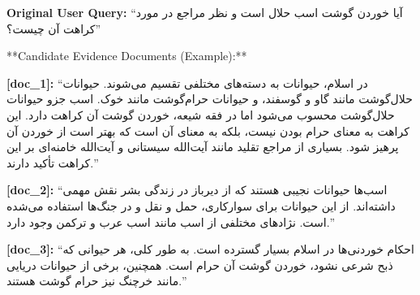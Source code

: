 \documentclass[11pt]{article}
\newcommand{\fa}[1]{\textfarsi{#1}}
\begin{document}
\noindent\textbf{Original User Query:} \fa{``آیا خوردن گوشت اسب حلال است و نظر مراجع در مورد کراهت آن چیست؟''}

\begin{PromptBlock}

**Candidate Evidence Documents (Example):**
\end{PromptBlock}

\noindent\textbf{[doc\_1]:} \fa{``در اسلام، حیوانات به دسته‌های مختلفی تقسیم می‌شوند. حیوانات حلال‌گوشت مانند گاو و گوسفند، و حیوانات حرام‌گوشت مانند خوک. اسب جزو حیوانات حلال‌گوشت محسوب می‌شود اما در فقه شیعه، خوردن گوشت آن کراهت دارد. این کراهت به معنای حرام بودن نیست، بلکه به معنای آن است که بهتر است از خوردن آن پرهیز شود. بسیاری از مراجع تقلید مانند آیت‌الله سیستانی و آیت‌الله خامنه‌ای بر این کراهت تأکید دارند.''}

\begin{PromptBlock}
\end{PromptBlock}

\noindent\textbf{[doc\_2]:} \fa{``اسب‌ها حیوانات نجیبی هستند که از دیرباز در زندگی بشر نقش مهمی داشته‌اند. از این حیوانات برای سوارکاری، حمل و نقل و در جنگ‌ها استفاده می‌شده است. نژادهای مختلفی از اسب مانند اسب عرب و ترکمن وجود دارد.''}

\begin{PromptBlock}
\end{PromptBlock}

\noindent\textbf{[doc\_3]:} \fa{``احکام خوردنی‌ها در اسلام بسیار گسترده است. به طور کلی، هر حیوانی که ذبح شرعی نشود، خوردن گوشت آن حرام است. همچنین، برخی از حیوانات دریایی مانند خرچنگ نیز حرام گوشت هستند.''}
\end{document}
